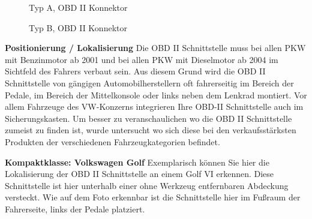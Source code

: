 \begin{figure}[!htb]\centering
   \begin{minipage}{0.49\textwidth}
     \caption{Typ A, OBD II Konnektor \cite{SIMR.CH2-CAN-Bus.OBDIITypeA}}\label{Fig:Data1}
   \end{minipage}
   \begin {minipage}{0.49\textwidth}
     \caption{Typ B, OBD II Konnektor \cite{SIMR.CH2-CAN-Bus.OBDIITypeB}}\label{Fig:Data2}
   \end{minipage}
\end{figure}


\textbf{Positionierung / Lokalisierung\nextline}
Die OBD II Schnittstelle muss bei allen PKW mit Benzinmotor ab 2001 und bei allen PKW mit Dieselmotor ab 2004 im Sichtfeld des Fahrers verbaut sein. Aus diesem Grund wird die OBD II Schnittstelle von gängigen Automobilherstellern oft fahrerseitig im Bereich der Pedale, im Bereich der Mittelkonsole oder links neben dem Lenkrad montiert. Vor allem Fahrzeuge des VW-Konzerns integrieren Ihre OBD-II Schnittstelle auch im Sicherungskasten. Um besser zu veranschaulichen wo die OBD II Schnittstelle zumeist zu finden ist, wurde untersucht wo sich diese bei den verkaufsstärksten Produkten der verschiedenen Fahrzeugkategorien befindet.

\textbf{Kompaktklasse: Volkswagen Golf}
Exemplarisch können Sie hier die Lokalisierung der OBD II Schnittstelle an einem Golf VI erkennen. Diese Schnittstelle ist hier unterhalb einer ohne Werkzeug entfernbaren Abdeckung versteckt. Wie auf dem Foto erkennbar ist die Schnittstelle hier im Fußraum der Fahrerseite, links der Pedale platziert.

